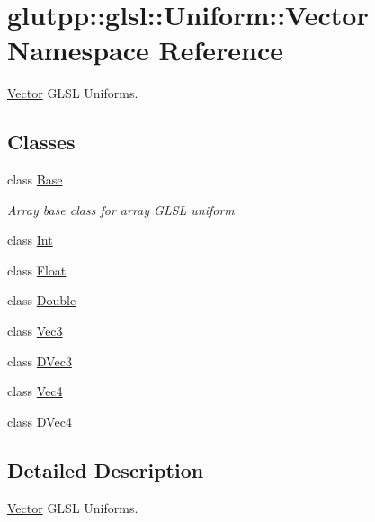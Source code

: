 \hypertarget{namespaceglutpp_1_1glsl_1_1Uniform_1_1Vector}{\section{glutpp\-:\-:glsl\-:\-:\-Uniform\-:\-:\-Vector \-Namespace \-Reference}
\label{namespaceglutpp_1_1glsl_1_1Uniform_1_1Vector}
}


\hyperlink{namespaceglutpp_1_1glsl_1_1Uniform_1_1Vector}{\-Vector} \-G\-L\-S\-L \-Uniforms.  


\subsection*{\-Classes}
\begin{DoxyCompactItemize}
\item 
class \hyperlink{classglutpp_1_1glsl_1_1Uniform_1_1Vector_1_1Base}{\-Base}
\begin{DoxyCompactList}\small\item\em \-Array base class for array \-G\-L\-S\-L uniform \end{DoxyCompactList}\item 
class \hyperlink{classglutpp_1_1glsl_1_1Uniform_1_1Vector_1_1Int}{\-Int}
\item 
class \hyperlink{classglutpp_1_1glsl_1_1Uniform_1_1Vector_1_1Float}{\-Float}
\item 
class \hyperlink{classglutpp_1_1glsl_1_1Uniform_1_1Vector_1_1Double}{\-Double}
\item 
class \hyperlink{classglutpp_1_1glsl_1_1Uniform_1_1Vector_1_1Vec3}{\-Vec3}
\item 
class \hyperlink{classglutpp_1_1glsl_1_1Uniform_1_1Vector_1_1DVec3}{\-D\-Vec3}
\item 
class \hyperlink{classglutpp_1_1glsl_1_1Uniform_1_1Vector_1_1Vec4}{\-Vec4}
\item 
class \hyperlink{classglutpp_1_1glsl_1_1Uniform_1_1Vector_1_1DVec4}{\-D\-Vec4}
\end{DoxyCompactItemize}


\subsection{\-Detailed \-Description}
\hyperlink{namespaceglutpp_1_1glsl_1_1Uniform_1_1Vector}{\-Vector} \-G\-L\-S\-L \-Uniforms. 